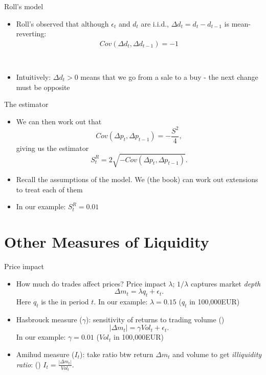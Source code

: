 \documentclass[english,10pt
,aspectratio=169
]{beamer}
\begin{document}
\begin{frame}{Roll's model}
	\begin{itemize}
		\item Roll's observed that although $\epsilon_t$ and $d_t$ are i.i.d., $\Delta d_t = d_t - d_{t-1}$ is mean-reverting:
		\begin{align*}
		Cov(\Delta d_t, \Delta d_{t-1})	= -1
		\\
		\\
		\\
		\\
		\\
		\end{align*}
		\item Intuitively: $\Delta d_t>0$ means that we go from a sale to a buy - the next change must be opposite
	\end{itemize}
\end{frame}


\begin{frame}{The estimator}
	\begin{itemize}
		\item We can then work out that
		\[
		Cov(\Delta p_t, \Delta p_{t-1}) = - \frac{S^2}{4},
		\]
		giving us the estimator
		\[
		S^R_t = 2 \sqrt{-Cov(\Delta p_t, \Delta p_{t-1})}.
		\]
		\item Recall the assumptions of the model. We (the book) can work out extensions to treat each of them
		\item In our example: $S^R_t = 0.01$
	\end{itemize}
\end{frame}


\section{Other Measures of Liquidity}


\begin{frame}{Price impact}
\begin{itemize}
	\item How much do trades affect prices? \alert{Price impact} $\lambda$;  $1/\lambda$ captures market \textit{depth}
	\[
	\Delta m_t = \lambda q_t + \epsilon_t.
	\]
	Here $q_t$ is the  in period $t$. 	
	In our example: $\lambda = 0.15 $ ($q_t$ in 100,000EUR)
	\item \alert{Hasbrouck measure} ($\gamma$): sensitivity of returns to trading volume (\citet{hasbrouck_empirical_2007})
	\[
	|\Delta m_t | = \gamma Vol_t + \epsilon_t.
	\]
	In our example: $\gamma = 0.01$ ($Vol_t$ in 100,000EUR)
	\item \alert{Amihud measure} ($I_t$): take ratio btw return $\Delta m_t$ and volume to get \textit{illiquidity ratio}: (\citet{amihud_illiquidity_2002})
	\center
	$I_t = \frac{|\Delta m_t|}{Vol_t}$.
\end{itemize}
\end{frame}
\end{document}

